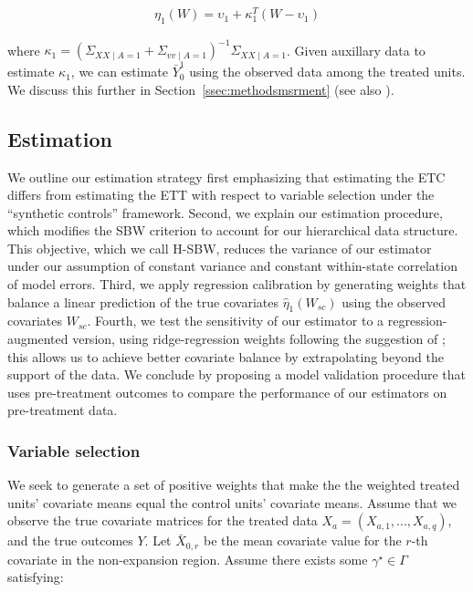 \documentclass[aoas]{imsart}
\theoremstyle{plain}
\theoremstyle{remark}
\begin{document}
\begin{align*}
\eta_1(W) = \upsilon_1 + \kappa_1^T(W - \upsilon_1)
\end{align*}

where $\kappa_1 = (\Sigma_{XX \mid A = 1} + \Sigma_{vv \mid A = 1})^{-1}\Sigma_{XX \mid A = 1}$. Given auxillary data to estimate $\kappa_1$, we can estimate $\bar{Y}^1_0$ using the observed data among the treated units. We discuss this further in Section~\ref{ssec:methodsmsrment} (see also \cite{gleser1992importance}).

\subsection{Estimation}

We outline our estimation strategy first emphasizing that estimating the ETC differs from estimating the ETT with respect to variable selection under the ``synthetic controls'' framework. Second, we explain our estimation procedure, which modifies the SBW criterion to account for our hierarchical data structure. This objective, which we call H-SBW, reduces the variance of our estimator under our assumption of constant variance and constant within-state correlation of model errors. Third, we apply regression calibration by generating weights that balance a linear prediction of the true covariates $\hat{\eta}_1(W_{sc})$ using the observed covariates $W_{sc}$. Fourth, we test the sensitivity of our estimator to a regression-augmented version, using ridge-regression weights following the suggestion of \cite{ben2018augmented}; this allows us to achieve better covariate balance by extrapolating beyond the support of the data. We conclude by proposing a model validation procedure that uses pre-treatment outcomes to compare the performance of our estimators on pre-treatment data.

\subsubsection{Variable selection}

We seek to generate a set of positive weights that make the the weighted treated units' covariate means equal the control units' covariate means. Assume that we observe the true covariate matrices for the treated data $X_a = (X_{a,1}, ..., X_{a, q})$, and the true outcomes $Y$. Let $\bar{X}_{0, r}$ be the mean covariate value for the $r$-th covariate in the non-expansion region. Assume there exists some $\gamma^\star \in \Gamma$ satisfying: 
\end{document}
